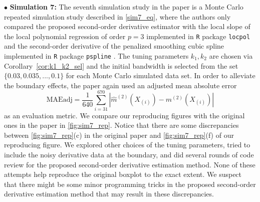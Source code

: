 \documentclass{uwstat572}
\theoremstyle{definition}
\renewcommand{\hat}{\widehat}
\theoremstyle{theorem}
\begin{document}
$\bullet$ {\bf Simulation 7:} The seventh simulation study in the paper \citep{liu2020smoothed} is a Monte Carlo repeated simulation study described in \eqref{sim7_eq}, where the authors only compared the proposed second-order derivative estimator with the local slope of the local polynomial regression of order $p=3$ implemented in \texttt{R} package \texttt{locpol} \citep{locpol2022R} and the second-order derivative of the penalized smoothing cubic spline implemented in \texttt{R} package \texttt{pspline} \citep{pspline2022R}. The tuning parameters $k_1,k_2$ are chosen via Corollary~\ref{cor:k1_k2_sel} and the initial bandwidth is selected from the set $\{0.03, 0.035,...,0.1\}$ for each Monte Carlo simulated data set. In order to alleviate the boundary effects, the paper again used an adjusted mean absolute error 
$$\text{MAEadj}=\frac{1}{640}\sum_{i=31}^{670} \left|\hat{m}^{(2)}(X_{(i)}) -m^{(2)}(X_{(i)}) \right|$$
as an evaluation metric. We compare our reproducing figures with the original ones in the paper in \autoref{fig:sim7_rep}. Notice that there are some discrepancies between \autoref{fig:sim7_rep}(c) in the original paper and \autoref{fig:sim7_rep}(f) of our reproducing figure. We explored other choices of the tuning parameters, tried to include the noisy derivative data at the boundary, and did several rounds of code review for the proposed second-order derivative estimation method. None of these attempts help reproduce the original boxplot to the exact extent. We suspect that there might be some minor programming tricks in the proposed second-order derivative estimation method that may result in these discrepancies.
\end{document}
